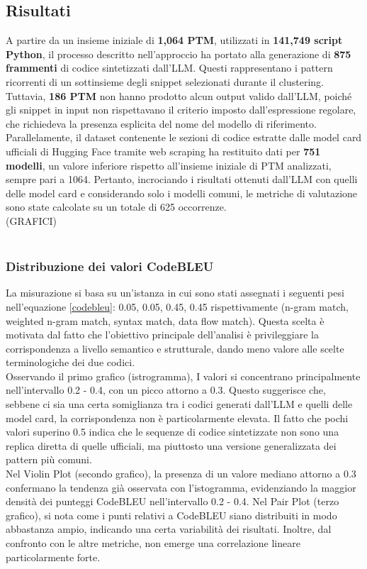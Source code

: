 \documentclass{article}
\begin{document}
\subsection{Risultati}
A partire da un insieme iniziale di \textbf{1,064 PTM}, utilizzati in \textbf{141,749 script Python}, il processo descritto nell’approccio ha portato alla generazione di \textbf{875 frammenti} di codice sintetizzati dall’LLM. Questi rappresentano i pattern ricorrenti di un sottinsieme degli snippet selezionati durante il clustering. Tuttavia, \textbf{186 PTM} non hanno prodotto alcun output valido dall’LLM, poiché gli snippet in input non rispettavano il criterio imposto dall’espressione regolare, che richiedeva la presenza esplicita del nome del modello di riferimento.\\
Parallelamente, il dataset contenente le sezioni di codice estratte dalle model card ufficiali di Hugging Face tramite web scraping ha restituito dati per \textbf{751 modelli}, un valore inferiore rispetto all'insieme iniziale di PTM analizzati, sempre pari a 1064. Pertanto, incrociando i risultati ottenuti dall’LLM con quelli delle model card e considerando solo i modelli comuni, le metriche di valutazione sono state calcolate su un totale di 625 occorrenze.\\
(GRAFICI)\\
\\

\subsubsection{Distribuzione dei valori CodeBLEU}
La misurazione si basa su un'istanza in cui sono stati assegnati i seguenti pesi nell'equazione \ref{codebleu}: 0.05, 0.05, 0.45, 0.45 rispettivamente (n-gram match, weighted n-gram match, syntax match, data flow match). Questa scelta è motivata dal fatto che l’obiettivo principale dell’analisi è privileggiare la corrispondenza a livello semantico e strutturale, dando meno valore alle scelte terminologiche dei due codici.\\
Osservando il primo grafico (istrogramma), I valori si concentrano principalmente nell’intervallo 0.2 - 0.4, con un picco attorno a 0.3. Questo suggerisce che, sebbene ci sia una certa somiglianza tra i codici generati dall’LLM e quelli delle model card, la corrispondenza non è particolarmente elevata. Il fatto che pochi valori superino 0.5 indica che le sequenze di codice sintetizzate non sono una replica diretta di quelle ufficiali, ma piuttosto una versione generalizzata dei pattern più comuni.\\
Nel Violin Plot (secondo grafico), la presenza di un valore mediano attorno a 0.3 confermano la tendenza già osservata con l’istogramma, evidenziando la maggior densità dei punteggi CodeBLEU nell’intervallo 0.2 - 0.4. Nel Pair Plot (terzo grafico), si nota come i punti relativi a CodeBLEU siano distribuiti in modo abbastanza ampio, indicando una certa variabilità dei risultati. Inoltre, dal confronto con le altre metriche, non emerge una correlazione lineare particolarmente forte.
\end{document}
